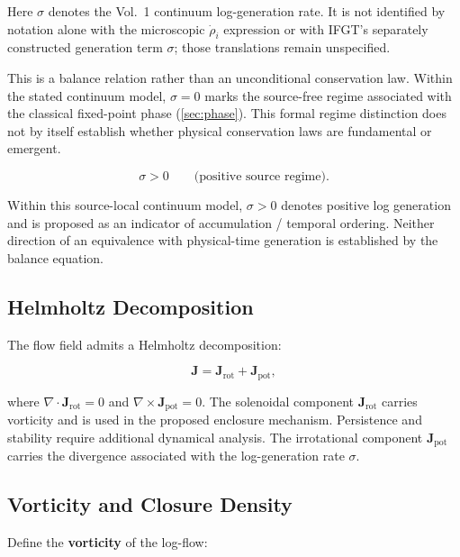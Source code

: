 \begin{remark}
Here $\sigma$ denotes the Vol.~1 continuum log-generation rate. It is not
identified by notation alone with the microscopic $\dot{\rho}_i$ expression
or with IFGT's separately constructed generation term $\sigma$; those
translations remain unspecified.
\end{remark}

This is a balance relation rather than an unconditional conservation law.
Within the stated continuum model, $\sigma = 0$ marks the source-free regime
associated with the classical fixed-point phase (\cref{sec:phase}).
This formal regime distinction does not by itself establish whether physical
conservation laws are fundamental or emergent.

\begin{keybox}
\begin{equation}
  \sigma > 0
  \qquad\text{(positive source regime).}
  \label{eq:sigma_time}
\end{equation}
\end{keybox}

Within this source-local continuum model, $\sigma>0$ denotes positive log
generation and is proposed as an indicator of accumulation / temporal
ordering.  Neither direction of an equivalence with physical-time generation
is established by the balance equation.

\subsection{Helmholtz Decomposition}

The flow field admits a Helmholtz decomposition:

\[
  \mathbf{J} = \mathbf{J}_{\text{rot}} + \mathbf{J}_{\text{pot}},
\]

where $\nabla \cdot \mathbf{J}_{\text{rot}} = 0$
and $\nabla \times \mathbf{J}_{\text{pot}} = 0$.
The solenoidal component $\mathbf{J}_{\text{rot}}$ carries vorticity and is
used in the proposed enclosure mechanism.  Persistence and stability require
additional dynamical analysis.
The irrotational component $\mathbf{J}_{\text{pot}}$ carries the divergence
associated with the log-generation rate $\sigma$.

\subsection{Vorticity and Closure Density}

Define the \textbf{vorticity} of the log-flow:

